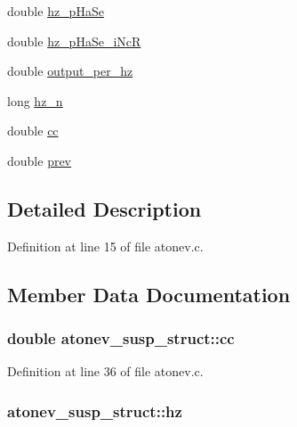 \begin{DoxyCompactItemize}
\item 
double \hyperlink{structatonev__susp__struct_a68cc3ede3061bf6514fabde3ee02338c}{hz\+\_\+p\+Ha\+Se}
\item 
double \hyperlink{structatonev__susp__struct_a0a3e3a61eb5fb4f49b507a089087eecc}{hz\+\_\+p\+Ha\+Se\+\_\+i\+NcR}
\item 
double \hyperlink{structatonev__susp__struct_a3e89e24064d8b4a4915b81973734a7d3}{output\+\_\+per\+\_\+hz}
\item 
long \hyperlink{structatonev__susp__struct_a2ff4eaf67868342c8dfa6129336af098}{hz\+\_\+n}
\item 
double \hyperlink{structatonev__susp__struct_ad0879bf93c95f3239edb6b9bcc11f617}{cc}
\item 
double \hyperlink{structatonev__susp__struct_a3ac8868bdaa151660c17a68229bbca2b}{prev}
\end{DoxyCompactItemize}


\subsection{Detailed Description}


Definition at line 15 of file atonev.\+c.



\subsection{Member Data Documentation}
\subsubsection[{\texorpdfstring{cc}{cc}}]{\setlength{\rightskip}{0pt plus 5cm}double atonev\+\_\+susp\+\_\+struct\+::cc}\hypertarget{structatonev__susp__struct_ad0879bf93c95f3239edb6b9bcc11f617}{}\label{structatonev__susp__struct_ad0879bf93c95f3239edb6b9bcc11f617}


Definition at line 36 of file atonev.\+c.

\subsubsection[{\texorpdfstring{hz}{hz}}]{ atonev\+\_\+susp\+\_\+struct\+::hz}\hypertarget{structatonev__susp__struct_a64e21eb71e0a79cd37b05f20cb5a9028}{}\label{structatonev__susp__struct_a64e21eb71e0a79cd37b05f20cb5a9028}


